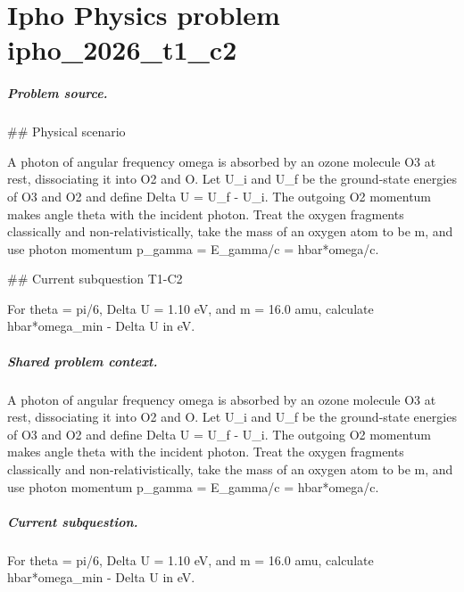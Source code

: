 
\chapter{Ipho Physics problem ipho\_2026\_t1\_c2}
\label{ch:IPhO2026Problems_problem_ipho_2026_t1_c2}

\paragraph{Problem source.}
\#\# Physical scenario

A photon of angular frequency omega is absorbed by an ozone molecule O3 at rest,
dissociating it into O2 and O.  Let U\_i and U\_f be the ground-state energies of
O3 and O2 and define Delta U = U\_f - U\_i.  The outgoing O2 momentum makes angle
theta with the incident photon.  Treat the oxygen fragments classically and
non-relativistically, take the mass of an oxygen atom to be m, and use photon
momentum p\_gamma = E\_gamma/c = hbar*omega/c.

\#\# Current subquestion T1-C2

For theta = pi/6, Delta U = 1.10 eV, and m = 16.0 amu, calculate hbar*omega\_min - Delta U in eV.

\paragraph{Shared problem context.}
A photon of angular frequency omega is absorbed by an ozone molecule O3 at rest,
dissociating it into O2 and O.  Let U\_i and U\_f be the ground-state energies of
O3 and O2 and define Delta U = U\_f - U\_i.  The outgoing O2 momentum makes angle
theta with the incident photon.  Treat the oxygen fragments classically and
non-relativistically, take the mass of an oxygen atom to be m, and use photon
momentum p\_gamma = E\_gamma/c = hbar*omega/c.

\paragraph{Current subquestion.}
For theta = pi/6, Delta U = 1.10 eV, and m = 16.0 amu, calculate hbar*omega\_min - Delta U in eV.

